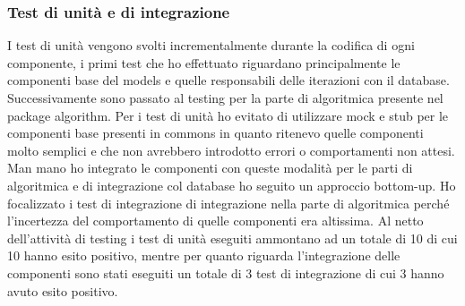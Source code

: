 \subsubsection{Test di unità e di integrazione}
I test di unità vengono svolti incrementalmente durante la codifica di ogni componente, i primi test che ho effettuato riguardano principalmente le componenti base del models e quelle responsabili delle iterazioni con il database. Successivamente sono passato al testing per la parte di algoritmica presente nel package algorithm. Per i test di unità ho evitato di utilizzare mock e stub per le componenti base presenti in commons in quanto ritenevo quelle componenti molto semplici e che non avrebbero introdotto errori o comportamenti non attesi. Man mano ho integrato le componenti con queste modalità per le parti di algoritmica e di integrazione col database ho seguito un approccio bottom-up. Ho focalizzato i test di integrazione di integrazione nella parte di algoritmica perché l'incertezza del comportamento di quelle componenti era altissima.
Al netto dell'attività di testing i test di unità eseguiti ammontano ad un totale di 10 di cui 10 hanno esito positivo, mentre per quanto riguarda l'integrazione delle componenti sono stati eseguiti un totale di 3 test di integrazione di cui 3 hanno avuto esito positivo.

